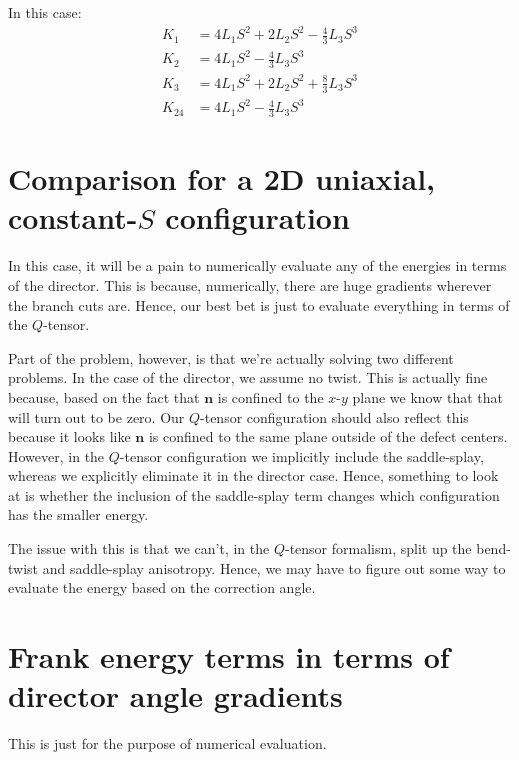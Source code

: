 \documentclass[reqno]{article}
\begin{document}
In this case:
\begin{equation}
\begin{split}
    K_1 &= 4 L_1 S^2 + 2 L_2 S^2 - \tfrac43 L_3 S^3 \\
    K_2 &= 4 L_1 S^2 - \tfrac43 L_3 S^3 \\
    K_3 &= 4 L_1 S^2 + 2 L_2 S^2 + \tfrac83 L_3 S^3 \\
    K_{24} &= 4 L_1 S^2 - \tfrac43 L_3 S^3
\end{split}
\end{equation}

\section{Comparison for a 2D uniaxial, constant-$S$ configuration}
In this case, it will be a pain to numerically evaluate any of the energies in terms of the director.
This is because, numerically, there are huge gradients wherever the branch cuts are.
Hence, our best bet is just to evaluate everything in terms of the $Q$-tensor.

Part of the problem, however, is that we're actually solving two different problems.
In the case of the director, we assume no twist. 
This is actually fine because, based on the fact that $\mathbf{n}$ is confined to the $x$-$y$ plane we know that that will turn out to be zero.
Our $Q$-tensor configuration should also reflect this because it looks like $\mathbf{n}$ is confined to the same plane outside of the defect centers.
However, in the $Q$-tensor configuration we implicitly include the saddle-splay, whereas we explicitly eliminate it in the director case.
Hence, something to look at is whether the inclusion of the saddle-splay term changes which configuration has the smaller energy.

The issue with this is that we can't, in the $Q$-tensor formalism, split up the bend-twist and saddle-splay anisotropy.
Hence, we may have to figure out some way to evaluate the energy based on the correction angle.

\section{Frank energy terms in terms of director angle gradients}
This is just for the purpose of numerical evaluation.
\end{document}
